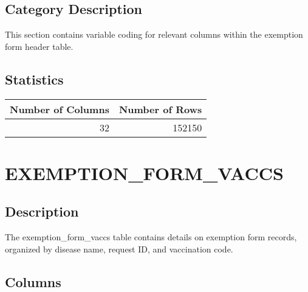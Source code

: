 \documentclass[
  letterpaper,
  DIV=11,
  numbers=noendperiod]{scrreprt}
\begin{document}
\hypertarget{category-description-8}{%
\section*{Category Description}\label{category-description-8}}

This section contains variable coding for relevant columns within the
exemption form header table.

\hypertarget{statistics-8}{%
\section*{Statistics}\label{statistics-8}}

\begin{longtable}{rr}
\toprule
Number of Columns & Number of Rows \\ 
\midrule
32 & 152150 \\ 
\bottomrule
\end{longtable}

\hypertarget{exemption_form_vaccs}{%
\chapter*{EXEMPTION\_FORM\_VACCS}\label{exemption_form_vaccs}}

\hypertarget{description-9}{%
\section*{Description}\label{description-9}}

The exemption\_form\_vaccs table contains details on exemption form
records, organized by disease name, request ID, and vaccination code.

\hypertarget{columns-9}{%
\section*{Columns}\label{columns-9}}
\end{document}

